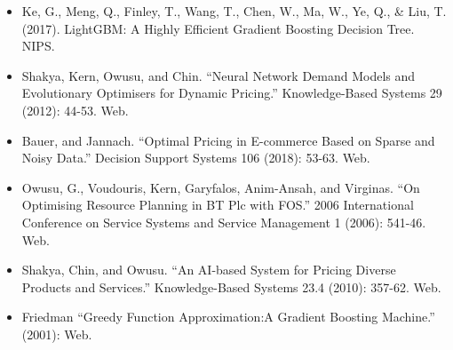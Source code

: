 \documentclass[]{article}
\providecommand{\tightlist}{%
  \setlength{\itemsep}{0pt}\setlength{\parskip}{0pt}}
\begin{document}
\begin{itemize}
\tightlist
\item
  Ke, G., Meng, Q., Finley, T., Wang, T., Chen, W., Ma, W., Ye, Q., \&
  Liu, T. (2017). LightGBM: A Highly Efficient Gradient Boosting
  Decision Tree. NIPS.
\item
  Shakya, Kern, Owusu, and Chin. ``Neural Network Demand Models and
  Evolutionary Optimisers for Dynamic Pricing.'' Knowledge-Based Systems
  29 (2012): 44-53. Web.
\item
  Bauer, and Jannach. ``Optimal Pricing in E-commerce Based on Sparse
  and Noisy Data.'' Decision Support Systems 106 (2018): 53-63. Web.
\item
  Owusu, G., Voudouris, Kern, Garyfalos, Anim-Ansah, and Virginas. ``On
  Optimising Resource Planning in BT Plc with FOS.'' 2006 International
  Conference on Service Systems and Service Management 1 (2006): 541-46.
  Web.
\item
  Shakya, Chin, and Owusu. ``An AI-based System for Pricing Diverse
  Products and Services.'' Knowledge-Based Systems 23.4 (2010): 357-62.
  Web.
\item
  Friedman ``Greedy Function Approximation:A Gradient Boosting
  Machine.'' (2001): Web.
\end{itemize}
\end{document}
